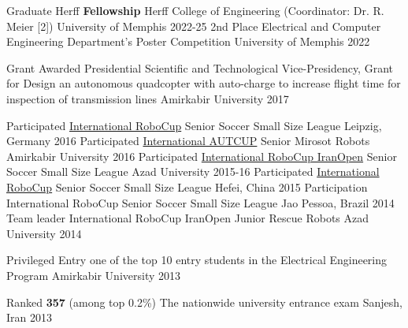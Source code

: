 


\begin{cvhonors}

  \cvhonor
  {Graduate Herff \textbf{Fellowship}}
  {Herff College of Engineering (Coordinator: Dr. R. Meier [2])}
  {University of Memphis}
  {2022-25}
  \cvhonor
    {2nd Place}
        {Electrical and Computer Engineering Department's Poster Competition}
    {University of Memphis}
	{2022}

  \cvhonor
    {Grant Awarded} %
    {Presidential Scientific and Technological Vice-Presidency, Grant for Design an autonomous quadcopter with auto-charge to increase flight time for inspection of transmission lines} %
    {Amirkabir University} %
    {2017} %

      \cvhonor
    {Participated}
    {\href{https://en.wikipedia.org/wiki/RoboCup}{International RoboCup} Senior Soccer Small Size League}
    {Leipzig, Germany}
	{2016}
  \cvhonor
      {Participated}
      {\href{http://autcup.aut.ac.ir/2018/visitorpages/default.aspx?itemid=3}{International AUTCUP} Senior Mirosot Robots}
      {Amirkabir University}
	   {2016}
  \cvhonor
    {Participated}
    {\href{https://en.wikipedia.org/wiki/IranOpen}{International RoboCup IranOpen} Senior Soccer Small Size League}
    { Azad University}
	{2015-16}
  \cvhonor
    {Participated}
    {\href{https://en.wikipedia.org/wiki/RoboCup}{International RoboCup} Senior Soccer Small Size League}
    {Hefei, China}
	{2015}
  \cvhonor
    {Participation}
    {International RoboCup Senior Soccer Small Size League}
    {Jao Pessoa, Brazil}
	{2014}
  \cvhonor
    {Team leader}
    {International RoboCup IranOpen Junior Rescue Robots}
    { Azad University}
	{2014}

\cvhonor
 {Privileged Entry}
 {one of the top 10 entry students in the Electrical Engineering Program}
 {Amirkabir University}
 {2013}

\cvhonor
 {Ranked \textbf{357} (among top 0.2\%)}
 {The nationwide university entrance exam}
 {Sanjesh, Iran}
 {2013}
 

\end{cvhonors}
